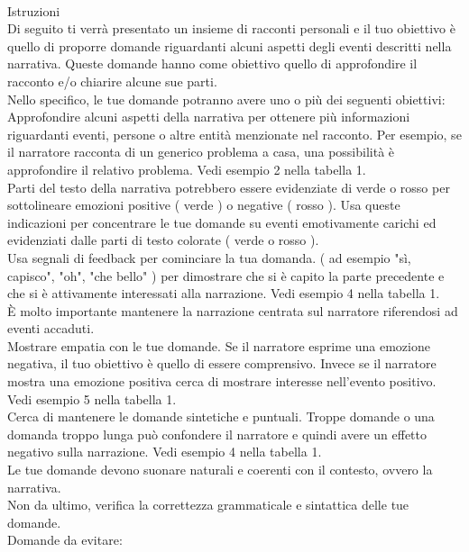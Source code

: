 \begin{itemize}
{       \\
       Istruzioni\\
       Di seguito ti verrà presentato un insieme di racconti personali e il tuo obiettivo è quello di proporre domande riguardanti alcuni aspetti degli eventi descritti nella narrativa. Queste domande hanno come obiettivo quello di approfondire il racconto e/o chiarire alcune sue parti.\\
       Nello specifico, le tue domande potranno avere uno o più dei seguenti obiettivi:\\
       Approfondire alcuni aspetti della narrativa per ottenere più informazioni riguardanti eventi, persone o altre entità menzionate nel racconto. Per esempio, se il narratore racconta di un generico problema a casa, una possibilità è approfondire il relativo problema. Vedi esempio 2 nella tabella 1.\\
       Parti del testo della narrativa potrebbero essere evidenziate di verde o rosso per sottolineare emozioni positive ( verde ) o negative ( rosso ). Usa queste indicazioni per concentrare le tue domande su eventi emotivamente carichi ed evidenziati dalle parti di testo colorate ( verde o rosso ).\\
       Usa segnali di feedback per cominciare la tua domanda. ( ad esempio "sì, capisco", "oh", "che bello" ) per dimostrare che si è capito la parte precedente e che si è attivamente interessati alla narrazione. Vedi esempio 4 nella tabella 1.\\
       È molto importante mantenere la narrazione centrata sul narratore riferendosi ad eventi accaduti.\\
       Mostrare empatia con le tue domande. Se il narratore esprime una emozione negativa, il tuo obiettivo è quello di essere comprensivo. Invece se il narratore mostra una emozione positiva cerca di mostrare interesse nell'evento positivo. Vedi esempio 5 nella tabella 1.\\
       Cerca di mantenere le domande sintetiche e puntuali. Troppe domande o una domanda troppo lunga può confondere il narratore e quindi avere un effetto negativo sulla narrazione. Vedi esempio 4 nella tabella 1.\\
       Le tue domande devono suonare naturali e coerenti con il contesto, ovvero la narrativa.\\
       Non da ultimo, verifica la correttezza grammaticale e sintattica delle tue domande.\\
       Domande da evitare:\\
}
\end{itemize}
